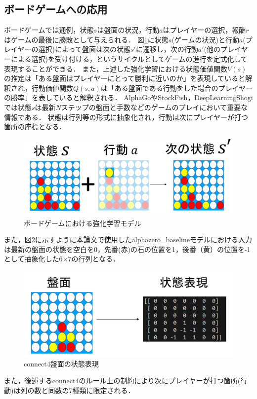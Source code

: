 \subsection{ボードゲームへの応用}
ボードゲームでは通例，状態$s$は盤面の状況，行動$a$はプレイヤーの選択，報酬$r$はゲームの最後に勝敗として与えられる．
図\ref{fig:board-game-model}に状態$s$(ゲームの状況)と行動$a$(プレイヤーの選択)によって盤面は次の状態$s'$に遷移し，次の行動$a'$(他のプレイヤーによる選択)を受け付ける，というサイクルとしてゲームの進行を定式化して表現することができる．
また，上述した強化学習における状態価値関数$V(s)$の推定は「ある盤面はプレイヤーにとって勝利に近いのか」を表現していると解釈され，行動価値関数$Q(s, a)$は「ある盤面である行動をした場合のプレイヤーの勝率」を表していると解釈される．
AlphaGo\cite{AlphaGo}やStockFish\cite{StockFish12}，DeepLearningShogi\cite{dlshogi}では状態$s$は最新$N$ステップの盤面と手数などのゲームのプレイにおいて重要な情報である．
状態は行列等の形式に抽象化され，行動は次にプレイヤーが打つ箇所の座標となる．
\begin{figure}[t]
	\includegraphics[width=\linewidth]{./figure/transition.png}
	\caption{ボードゲームにおける強化学習モデル}
	\label{fig:board-game-model}
\end{figure}

また，図\ref{fig:connect4-symbol}に示すように本論文で使用したalphazero\_baselineモデル\cite{baseline}における入力は最新の盤面の状態を空白を0，先番(赤)の石の位置を1，後番（黄）の位置を-1として抽象化した6$\times$7の行列となる．
\begin{figure}[t]
	\centering
	\includegraphics[width=\linewidth]{./figure/symbolic.png}
	\caption{connect4盤面の状態表現}
	\label{fig:connect4-symbol}
\end{figure}
また，後述するconnect4のルール上の制約により次にプレイヤーが打つ箇所(行動)は列の数と同数の7種類に限定される．

